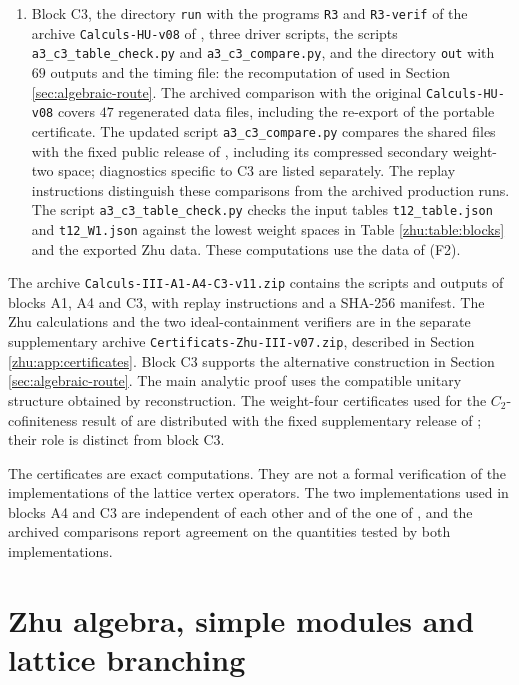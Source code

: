 \documentclass[leqno]{article}
\numberwithin{equation}{section}
\begin{document}
\begin{enumerate}
\item Block C3, the directory \nolinkurl{run} with the programs \nolinkurl{R3} and \nolinkurl{R3-verif} of the archive \nolinkurl{Calculs-HU-v08} of \cite{ArhII}, three driver scripts, the scripts \nolinkurl{a3_c3_table_check.py} and \nolinkurl{a3_c3_compare.py}, and the directory \nolinkurl{out} with $69$ outputs and the timing file: the recomputation of \cite[Section 7.5]{ArhII} used in Section \ref{sec:algebraic-route}. The archived comparison with the original \nolinkurl{Calculs-HU-v08} covers $47$ regenerated data files, including the re-export of the portable certificate. The updated script \nolinkurl{a3_c3_compare.py} compares the shared files with the fixed public release of \cite{ArhII}, including its compressed secondary weight-two space; diagnostics specific to C3 are listed separately. The replay instructions distinguish these comparisons from the archived production runs. The script \nolinkurl{a3_c3_table_check.py} checks the input tables \nolinkurl{t12_table.json} and \nolinkurl{t12_W1.json} against the lowest weight spaces in Table \ref{zhu:table:blocks} and the exported Zhu data. These computations use the data of (F2).
\end{enumerate}
The archive \nolinkurl{Calculs-III-A1-A4-C3-v11.zip} contains the scripts and outputs of blocks A1, A4 and C3, with replay instructions and a SHA-256 manifest. The Zhu calculations and the two ideal-containment verifiers are in the separate supplementary archive \nolinkurl{Certificats-Zhu-III-v07.zip}, described in Section \ref{zhu:app:certificates}. Block C3 supports the alternative construction in Section \ref{sec:algebraic-route}. The main analytic proof uses the compatible unitary structure obtained by reconstruction. The weight-four certificates used for the $C_2$-cofiniteness result of \cite[Theorem 10.21]{Arh26} are distributed with the fixed supplementary release of \cite{Arh26}; their role is distinct from block C3.

The certificates are exact computations. They are not a formal verification of the implementations of the lattice vertex operators. The two implementations used in blocks A4 and C3 are independent of each other and of the one of \cite{Arh26}, and the archived comparisons report agreement on the quantities tested by both implementations.


\appendix
\section{Zhu algebra, simple modules and lattice branching}
\label{app:zhu}
\end{document}
